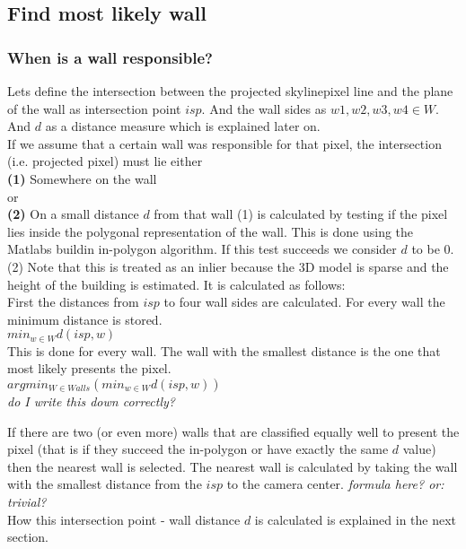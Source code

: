 \documentclass[10pt]{article}
\begin{document}
\subsection{Find most likely wall}
\subsubsection{When is a wall responsible?}
Lets define the intersection between the projected skylinepixel line and the
plane of the wall as intersection point $isp$. And the wall sides as ${w1, w2,
w3, w4 \in W}$. And $d$ as a distance measure which is explained later on.\\ If
we assume that a certain wall was responsible for that pixel, the intersection
(i.e. projected pixel) must lie either\\

\textbf{(1)} Somewhere on the wall 
\\
or
\\
\textbf{(2)} On a small distance $d$ from that wall
(1) is calculated by testing if the pixel lies inside the polygonal
representation of the wall. This is done using the Matlabs buildin in-polygon
algorithm. If this test succeeds we consider $d$ to be 0.\\

(2) Note that this is treated as an inlier because the 3D model is sparse and the height of
the building is estimated. It is calculated as follows: \\
First the distances from $isp$ to four wall sides are calculated.
For every wall the minimum distance is stored.\\
$min_{w\in W} d(isp, w)$\\
This is done for every wall. The wall with the smallest distance is the one that most likely presents the pixel.\\
$arg min_{W \in Walls} ( min_{w\in W} d(isp, w) )$\\
\textit{ do I write this down correctly?}


If there are two (or even more) walls that are classified equally well to
present the pixel (that is if they succeed the in-polygon or have exactly the
same $d$ value) then the nearest wall is selected. The nearest wall is
calculated by taking the wall with the smallest distance from the $isp$ to the
camera center.
\textit{ formula here? or: trivial?}\\
How this intersection point - wall distance $d$ is calculated is explained in
the next section.
\end{document}

